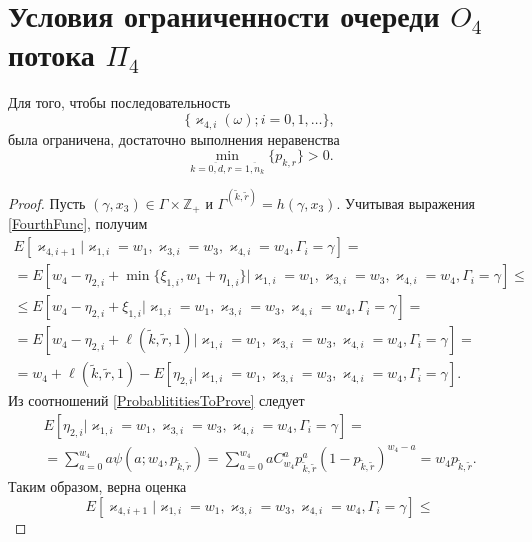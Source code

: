 \section{Условия ограниченности очереди $O_4$ потока $\Pi_4$}
\begin{theorem}
Для того,  чтобы последовательность 
$$
\{\varkappa_{4, i}(\omega); i =0,  1,  \ldots\}, 
$$ была ограничена,  достаточно выполнения неравенства
\begin{equation*}
    \min_{k=\overline{0, d},  r=\overline{1, n_k}} {\{p_{k, r}\}} > 0.
\end{equation*}
\end{theorem}
\begin{proof}
Пусть $(\gamma,  x_3) \in \Gamma \times {\mathbb Z}_+$ и  $\Gamma^{(\tilde{k}, \tilde{r})}=h(\gamma, x_3)$. Учитывая выражения \eqref{FourthFunc},  получим
\begin{multline*}
    E[\varkappa_{4, i+1} | \varkappa_{1, i}=w_1, \varkappa_{3, i}=w_3,  \varkappa_{4, i}=w_4,  \Gamma_i=\gamma] = \\
    =
    E[w_4 - \eta_{2, i} +  \min{\{\xi_{1, i},  w_1 + \eta_{1, i} \}} | \varkappa_{1, i}=w_1, \varkappa_{3, i}=w_3,  \varkappa_{4, i}=w_4,  \Gamma_i=\gamma] \leqslant \\
    \leqslant
     E[w_4 - \eta_{2, i} +  \xi_{1, i} | \varkappa_{1, i}=w_1, \varkappa_{3, i}=w_3,  \varkappa_{4, i}=w_4,  \Gamma_i=\gamma] =\\ 
     = 
     E[w_4 - \eta_{2, i} +  \ell(\tilde{k}, \tilde{r}, 1) | \varkappa_{1, i}=w_1, \varkappa_{3, i}=w_3,  \varkappa_{4, i}=w_4,  \Gamma_i=\gamma] = \\ 
    =
   w_4 + \ell(\tilde{k}, \tilde{r}, 1)  -  E[\eta_{2, i} | \varkappa_{1, i}=w_1, \varkappa_{3, i}=w_3,  \varkappa_{4, i}=w_4,  \Gamma_i=\gamma].
\end{multline*}
Из соотношений \eqref{ProbablititiesToProve} следует
\begin{multline*}
  E[\eta_{2, i} | \varkappa_{1, i}=w_1, \varkappa_{3, i}=w_3,  \varkappa_{4, i}=w_4,  \Gamma_i=\gamma]
= \\
=
\sum_{a=0}^{w_4}  a \psi(a;w_4,  p_{\tilde{k}, \tilde{r}}) = 
\sum_{a=0}^{w_4} a C_{w_4}^{a} p_{\tilde{k}, \tilde{r}}^a (1-p_{\tilde{k}, \tilde{r}})^{w_4-a} = w_4 p_{\tilde{k}, \tilde{r}}.
\end{multline*}
Таким образом, верна оценка 
\begin{equation*}
     E[\varkappa_{4, i+1} | \varkappa_{1, i}=w_1, \varkappa_{3, i}=w_3,  \varkappa_{4, i}=w_4,  \Gamma_i=\gamma] \leqslant

\end{equation*}
\end{proof}
